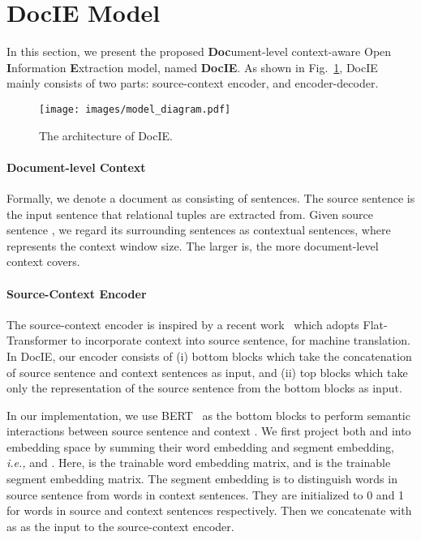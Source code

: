\documentclass[11pt,a4paper]{article}
\newcommand{\ie}{\emph{i.e.,}\xspace}
\newcommand{\mname}{DocIE\xspace}
\begin{document}
\section{\mname Model}


In this section, we present the proposed \textbf{Doc}ument-level context-aware Open \textbf{I}nformation \textbf{E}xtraction model, named \textbf{\mname}. As shown in Fig.~\ref{fig:DUCE-IE}, \mname mainly consists of two parts: source-context encoder, and encoder-decoder.

\begin{figure}
    \centering
    \texttt{[image: images/model\_diagram.pdf]}
    \caption{The architecture of \mname.}
    \vspace{-0.5em}
    \label{fig:DUCE-IE}
\end{figure}

\paragraph{Document-level Context} Formally, we denote a document as  consisting of  sentences. The source sentence  is the input sentence that relational tuples are extracted from. Given source sentence , we regard its surrounding sentences  as contextual sentences, where  represents the context window size. The larger  is, the more document-level context  covers.

\paragraph{Source-Context Encoder} The source-context encoder is inspired by a recent work~\cite{ma2020simple} which adopts Flat-Transformer to incorporate context into source sentence, for machine translation. In \mname, our encoder consists of (i) bottom blocks which take the concatenation of source sentence and context sentences as input, and (ii) top blocks which take only the representation of the source sentence from the bottom blocks as input.

In our implementation, we use BERT~\cite{devlin2018bert} as the bottom blocks to perform semantic interactions between source sentence  and context . We first project both  and  into embedding space by summing their word embedding and segment embedding, \ie  and . Here,  is the trainable word embedding matrix, and  is the trainable segment embedding matrix. The segment embedding is to distinguish words in source sentence from words in context sentences. They are initialized to 0 and 1 for words in source and context sentences respectively. Then we concatenate  with  as  as the input to the source-context encoder.
\end{document}
